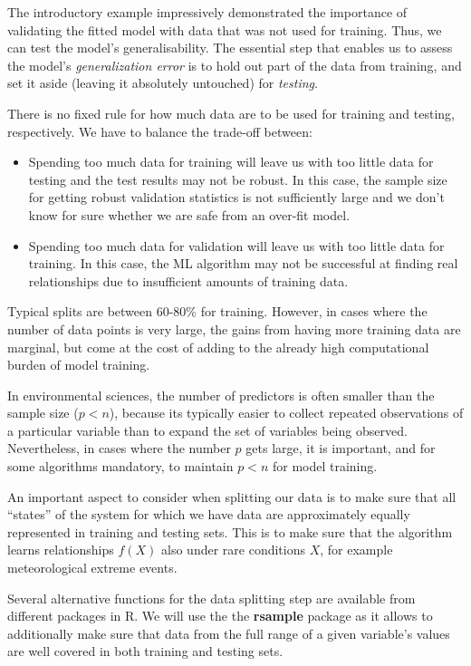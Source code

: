 \documentclass[
]{book}
\providecommand{\tightlist}{%
  \setlength{\itemsep}{0pt}\setlength{\parskip}{0pt}}
\begin{document}
The introductory example impressively demonstrated the importance of validating the fitted model with data that was not used for training. Thus, we can test the model's generalisability. The essential step that enables us to assess the model's \emph{generalization error} is to hold out part of the data from training, and set it aside (leaving it absolutely untouched) for \emph{testing}.

There is no fixed rule for how much data are to be used for training and testing, respectively. We have to balance the trade-off between:

\begin{itemize}
\tightlist
\item
  Spending too much data for training will leave us with too little data for testing and the test results may not be robust. In this case, the sample size for getting robust validation statistics is not sufficiently large and we don't know for sure whether we are safe from an over-fit model.
\item
  Spending too much data for validation will leave us with too little data for training. In this case, the ML algorithm may not be successful at finding real relationships due to insufficient amounts of training data.
\end{itemize}

Typical splits are between 60-80\% for training. However, in cases where the number of data points is very large, the gains from having more training data are marginal, but come at the cost of adding to the already high computational burden of model training.

In environmental sciences, the number of predictors is often smaller than the sample size (\(p < n\)), because its typically easier to collect repeated observations of a particular variable than to expand the set of variables being observed. Nevertheless, in cases where the number \(p\) gets large, it is important, and for some algorithms mandatory, to maintain \(p < n\) for model training.

An important aspect to consider when splitting our data is to make sure that all ``states'' of the system for which we have data are approximately equally represented in training and testing sets. This is to make sure that the algorithm learns relationships \(f(X)\) also under rare conditions \(X\), for example meteorological extreme events.

Several alternative functions for the data splitting step are available from different packages in R. We will use the the \textbf{rsample} package as it allows to additionally make sure that data from the full range of a given variable's values are well covered in both training and testing sets.
\end{document}

